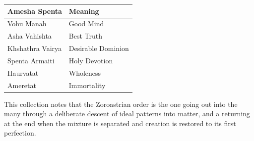 \begin{longtable}{ll}
\toprule
\textbf{Amesha Spenta} & \textbf{Meaning} \\
\midrule
Vohu Manah & Good Mind \\
Asha Vahishta & Best Truth \\
Khshathra Vairya & Desirable Dominion \\
Spenta Armaiti & Holy Devotion \\
Haurvatat & Wholeness \\
Ameretat & Immortality \\
\bottomrule
\end{longtable}

This collection notes that the Zoroastrian order is the one going out into the many through a deliberate descent of ideal patterns into matter, and a returning at the end when the mixture is separated and creation is restored to its first perfection.
